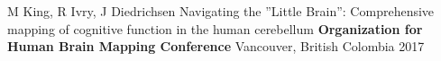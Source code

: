 \begin{cventries}
    
  \cventry
    {M King, R Ivry, J Diedrichsen} %
    {Navigating the ”Little Brain”: Comprehensive mapping of cognitive function in the human cerebellum} %
    {\textbf{Organization for Human Brain Mapping Conference}} %
    {Vancouver, British Colombia} %
   {2017} %
    
    
    

\end{cventries}


